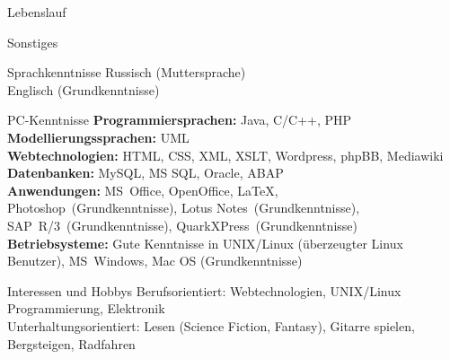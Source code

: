 \documentclass[10pt,a4paper]{scrartcl}
\begin{document}
\begin{cv}{Lebenslauf}
	\begin{cvlist}{Sonstiges}
		\item[Sprachkenntnisse]
			Russisch (Muttersprache)\\
			Englisch (Grundkenntnisse)
		\item[PC-Kenntnisse]
			\textbf{Programmiersprachen:} Java, C/C++, PHP\\
			\textbf{Modellierungssprachen:} UML\\
			\textbf{Webtechnologien:} HTML, CSS, XML, XSLT, Wordpress, phpBB,  Mediawiki\\
			\textbf{Datenbanken:} MySQL, MS SQL, Oracle, ABAP\\
			\textbf{Anwendungen:} MS Office, OpenOffice, LaTeX,\\ Photoshop (Grundkenntnisse), Lotus Notes (Grundkenntnisse), SAP R/3 (Grundkenntnisse), QuarkXPress (Grundkenntnisse)\\
			\textbf{Betriebsysteme:} Gute Kenntnisse in UNIX/Linux (überzeugter Linux Benutzer), MS Windows, Mac OS (Grundkenntnisse)
		\item[Interessen und Hobbys]
			Berufsorientiert: Webtechnologien, UNIX/Linux Programmierung, Elektronik\\
			Unterhaltungsorientiert: Lesen (Science Fiction, Fantasy), Gitarre spielen, Bergsteigen, Radfahren
	\end{cvlist}
	\end{cv}
\end{document}
